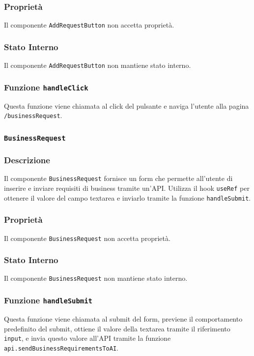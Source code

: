 \documentclass{article}
\begin{document}
\subsubsection*{Proprietà}
Il componente \texttt{AddRequestButton} non accetta proprietà.

\subsubsection*{Stato Interno}
Il componente \texttt{AddRequestButton} non mantiene stato interno.


\subsubsection*{Funzione \texttt{handleClick}}
Questa funzione viene chiamata al click del pulsante e naviga l'utente alla pagina \texttt{/businessRequest}.

\subsubsection*{\texttt{BusinessRequest}}

\subsubsection*{Descrizione}

Il componente \texttt{BusinessRequest} fornisce un form che permette all'utente di inserire e inviare requisiti di business tramite un'API. Utilizza il hook \texttt{useRef} per ottenere il valore del campo textarea e inviarlo tramite la funzione \texttt{handleSubmit}.

\subsubsection*{Proprietà}
Il componente \texttt{BusinessRequest} non accetta proprietà.

\subsubsection*{Stato Interno}
Il componente \texttt{BusinessRequest} non mantiene stato interno.


\subsubsection*{Funzione \texttt{handleSubmit}}
Questa funzione viene chiamata al submit del form, previene il comportamento predefinito del submit, ottiene il valore della textarea tramite il riferimento \texttt{input}, e invia questo valore all'API tramite la funzione \texttt{api.sendBusinessRequirementsToAI}.
\end{document}
